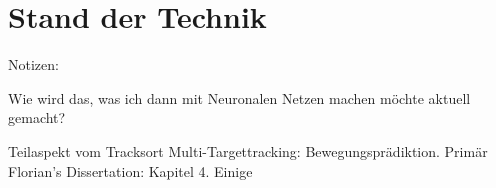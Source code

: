 \section{Stand der Technik}

Notizen:

Wie wird das, was ich dann mit Neuronalen Netzen machen möchte aktuell gemacht?


Teilaspekt vom Tracksort Multi-Targettracking: Bewegungsprädiktion.
Primär Florian's Dissertation: Kapitel 4.
Einige



